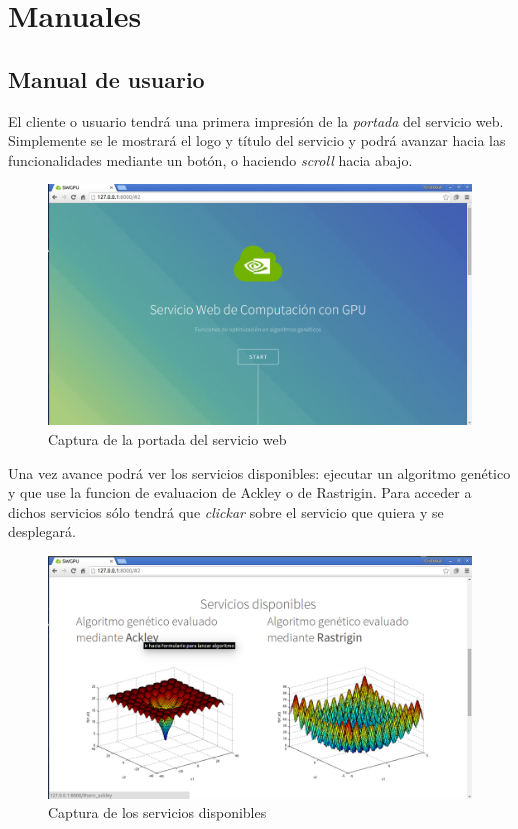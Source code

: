 \chapter{Manuales}


\section{Manual de usuario}
\bigskip

El cliente o usuario tendrá una primera impresión de la \textit{portada} del servicio web. Simplemente se le mostrará el logo y título del servicio y podrá avanzar hacia las funcionalidades mediante un botón, o haciendo \textit{scroll} hacia abajo.

\bigskip
\begin{figure}[h]
	\centering
	\includegraphics[width=1\linewidth]{../images/captura_web_1}
	\caption[Captura de la portada del servicio web]{Captura de la portada del servicio web}
	\label{fig:captura_web_1}
\end{figure}


Una vez avance podrá ver los servicios disponibles: ejecutar un algoritmo genético y que use la funcion de evaluacion de Ackley o de Rastrigin. Para acceder a dichos servicios sólo tendrá que \textit{clickar} sobre el servicio que quiera y se desplegará.

\bigskip
\begin{figure}[h]
	\centering
	\includegraphics[width=0.9\linewidth]{../images/captura_web_2}
	\caption[Captura de los servicios disponibles]{Captura de los servicios disponibles}
	\label{fig:captura_web_2}
\end{figure}


